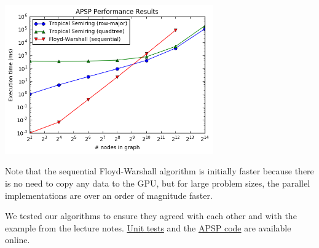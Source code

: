 \documentclass[12pt]{article}
\begin{document}
\begin{center}
\includegraphics[width=0.67\textwidth]{apsp-results.png}
\end{center}

Note that the sequential Floyd-Warshall algorithm is initially faster because there is no need to copy any data to the GPU, but for large problem sizes, the parallel implementations are over an order of magnitude faster.

We tested our algorithms to ensure they agreed with each other and with the example from the lecture notes. \href{https://github.com/span314/cs205group/blob/master/unit_tests.c}{Unit tests} and the \href{https://github.com/span314/cs205group/blob/master/APSP.c}{APSP code} are available online.
\end{document}
